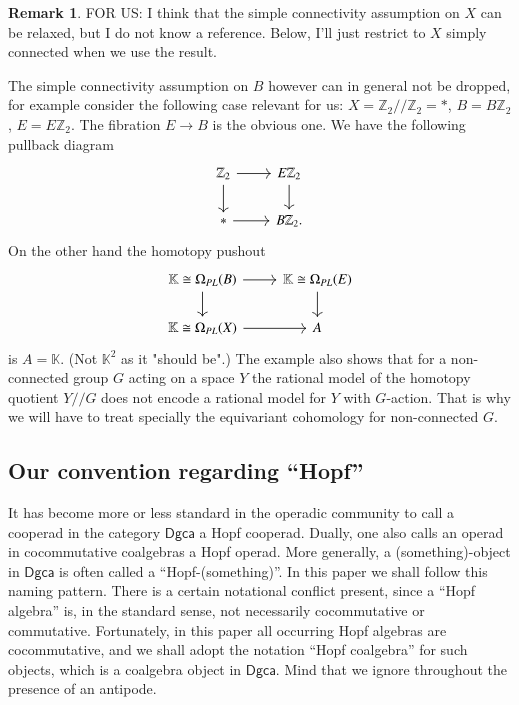 \documentclass[a4paper]{amsart}
\theoremstyle{plain}
\theoremstyle{definition}
\newtheorem{rem}[thm]{Remark}
\newcommand{\Z}{{\mathbb{Z}}}
\newcommand{\K}{{\mathbb{K}}}
\newcommand{\dgca}{\mathsf{Dgca}}
\begin{document}
\begin{rem}
FOR US: I think that the simple connectivity assumption on $X$ can be relaxed, but I do not know a reference. Below, I'll just restrict to $X$ simply connected when we use the result.

The simple connectivity assumption on $B$ however can in general not be dropped, for example consider the following case relevant for us:
$X=\Z_2//\Z_2=*$, $B=B\Z_2$, $E=E\Z_2$. The fibration $E\to B$ is the obvious one. We have the following pullback diagram 
\[
\begin{tikzcd}
\Z_2  \ar{r}\ar{d} & E\Z_2 \ar{d} \\
* \ar {r} & B\Z_2 .
\end{tikzcd}
\]
On the other hand the homotopy pushout 
\[
\begin{tikzcd}
\K\cong \Omega_{PL}(B)  \ar{r}\ar{d} & \K\cong\Omega_{PL}(E) \ar{d} \\
\K\cong\Omega_{PL}(X) \ar {r} & A 
\end{tikzcd}
\]
is $A=\K$. (Not $\K^2$ as it "should be".)
The example also shows that for a non-connected group $G$ acting on a space $Y$ the rational model of the homotopy quotient $Y//G$ does not encode a rational model for $Y$ with $G$-action. That is why we will have to treat specially the equivariant cohomology for non-connected $G$. 
\end{rem}

\subsection{Our convention regarding ``Hopf''}
It has become more or less standard in the operadic community to call a cooperad in the category $\dgca$ a Hopf cooperad.
Dually, one also calls an operad in cocommutative coalgebras a Hopf operad.
More generally, a (something)-object in $\dgca$ is often called a ``Hopf-(something)''.
In this paper we shall follow this naming pattern.
There is a certain notational conflict present, since a ``Hopf algebra'' is, in the standard sense, not necessarily cocommutative or commutative.
Fortunately, in this paper all occurring Hopf algebras are cocommutative, and we shall adopt the notation ``Hopf coalgebra'' for such objects, which is a coalgebra object in $\dgca$.
Mind that we ignore throughout the presence of an antipode.
\end{document}
